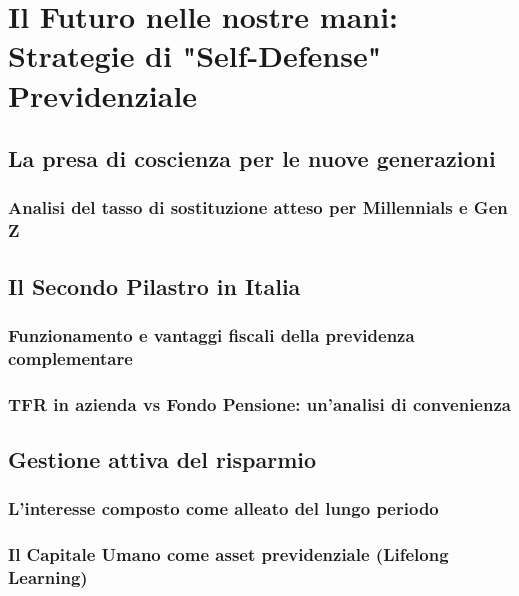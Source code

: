 \chapter{Il Futuro nelle nostre mani: Strategie di "Self-Defense" Previdenziale}
\label{chap:futuro}

\section{La presa di coscienza per le nuove generazioni}
\subsection{Analisi del tasso di sostituzione atteso per Millennials e Gen Z}

\section{Il Secondo Pilastro in Italia}
\subsection{Funzionamento e vantaggi fiscali della previdenza complementare}
\subsection{TFR in azienda vs Fondo Pensione: un'analisi di convenienza}

\section{Gestione attiva del risparmio}
\subsection{L'interesse composto come alleato del lungo periodo}
\subsection{Il Capitale Umano come asset previdenziale (Lifelong Learning)}
